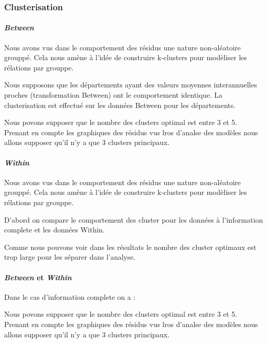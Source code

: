 \documentclass[11pt,]{article}
\let\oldparagraph\paragraph
\renewcommand{\paragraph}[1]{\oldparagraph{#1}\mbox{}}
\begin{document}
\hypertarget{clusterisation}{%
\subsubsection{Clusterisation}\label{clusterisation}}

\hypertarget{between}{%
\paragraph{\texorpdfstring{\emph{Between}}{Between}}\label{between}}

Nous avons vus dans le comportement des résidus une nature non-aléatoire
grouppé. Cela nous amène à l'idée de construire k-clusters pour
modèliser les rélations par grouppe.

Nous supposons que les départements ayant des valeurs moyennes
interannuelles proches (transformation Between) ont le comportement
identique. La clusterisation est effectué sur les données Between pour
les départements.

Nous povons supposer que le nombre des clusters optimal est entre 3 et
5. Prenant en compte les graphiques des résidus vus lros d'analse des
modèles nous allons supposer qu'il n'y a que 3 clusters principaux.

\hypertarget{within}{%
\paragraph{\texorpdfstring{\emph{Within}}{Within}}\label{within}}

Nous avons vus dans le comportement des résidus une nature non-aléatoire
grouppé. Cela nous amène à l'idée de construire k-clusters pour
modèliser les rélations par grouppe.

D'abord on compare le comportement des cluster pour les données à
l'information complete et les données Within.

Comme nous pouvons voir dans les résultats le nombre des cluster
optimaux est trop large pour les séparer dans l'analyse.

\hypertarget{between-et-within}{%
\paragraph{\texorpdfstring{\emph{Between} et
\emph{Within}}{Between et Within}}\label{between-et-within}}

Dans le cas d'information complete on a :

Nous povons supposer que le nombre des clusters optimal est entre 3 et
5. Prenant en compte les graphiques des résidus vus lros d'analse des
modèles nous allons supposer qu'il n'y a que 3 clusters principaux.
\end{document}

